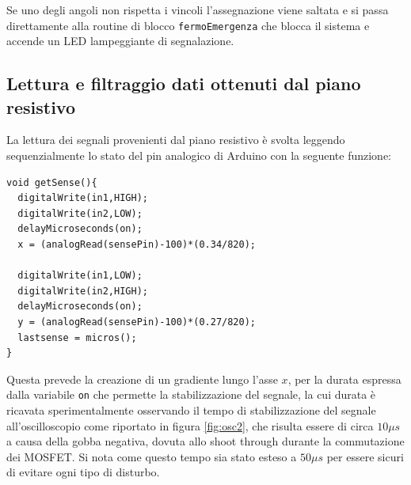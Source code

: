 \documentclass[12pt,twoside,openright]{report}
\begin{document}
Se uno degli angoli non rispetta i vincoli l'assegnazione viene saltata e si passa direttamente alla routine di blocco \texttt{fermoEmergenza} che blocca il sistema e accende un LED lampeggiante di segnalazione.

\subsection{Lettura e filtraggio dati ottenuti dal piano resistivo}
La lettura dei segnali provenienti dal piano resistivo è svolta leggendo sequenzialmente lo stato del pin analogico di Arduino con la seguente funzione:
\begin{verbatim}
void getSense(){
  digitalWrite(in1,HIGH);
  digitalWrite(in2,LOW);
  delayMicroseconds(on);
  x = (analogRead(sensePin)-100)*(0.34/820);

  digitalWrite(in1,LOW);
  digitalWrite(in2,HIGH);
  delayMicroseconds(on);
  y = (analogRead(sensePin)-100)*(0.27/820);
  lastsense = micros();
}
\end{verbatim}
Questa prevede la creazione di un gradiente lungo l'asse $x$, per la durata espressa dalla variabile \texttt{on} che permette la stabilizzazione del segnale, la cui durata è ricavata sperimentalmente osservando il tempo di stabilizzazione del segnale all'oscilloscopio come riportato in figura \ref{fig:osc2}, che risulta essere di circa $10\mu s$ a causa della gobba negativa, dovuta allo shoot through durante la commutazione dei MOSFET. Si nota come questo tempo sia stato esteso a $50 \mu s$ per essere sicuri di evitare ogni tipo di disturbo.
\end{document}
